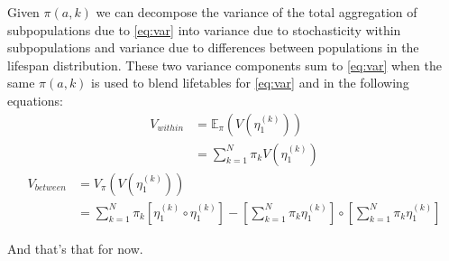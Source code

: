 \documentclass[12pt,oneside,a4paper]{article} %
\theoremstyle{definition}
\begin{document}
Given $\pi(a,k)$ we can decompose the variance of the total
aggregation of subpopulations due to \eqref{eq:var} into variance due to
stochasticity within subpopulations and variance due to differences between
populations in the lifespan distribution. These two variance components sum to
\eqref{eq:var} when the same $\pi(a,k)$ is used to blend lifetables for
\eqref{eq:var} and in the following equations:
\begin{align}
V_{within} &= \mathbb{E}_\pi \left( V(\eta_1^{(k)})\right)\\
 &= \sum_{k=1}^N \pi_k V(\eta_1^{(k)})
\end{align}
\begin{align}
V_{between} &= V_\pi \left( V(\eta_1^{(k)})\right)\\
 &= \sum_{k=1}^N \pi_k \left[ \eta_1^{(k)} \circ \eta_1^{(k)}\right] - \left[
 \sum_{k=1}^N \pi_k \eta_1^{(k)} \right] \circ \left[ \sum_{k=1}^N \pi_k
 \eta_1^{(k)} \right]
\end{align}

And that's that for now.
\end{document}
